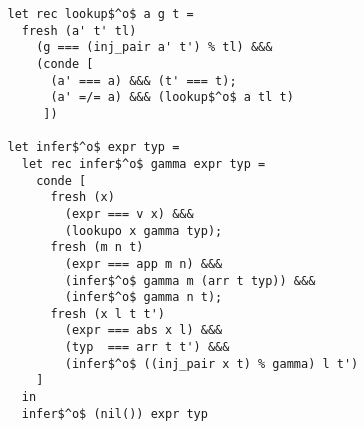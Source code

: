 \begin{lstlisting}
   let rec lookup$^o$ a g t =
     fresh (a' t' tl)
       (g === (inj_pair a' t') % tl) &&&
       (conde [
         (a' === a) &&& (t' === t);
         (a' =/= a) &&& (lookup$^o$ a tl t)
        ])

   let infer$^o$ expr typ =
     let rec infer$^o$ gamma expr typ =
       conde [
         fresh (x)
           (expr === v x) &&&
           (lookupo x gamma typ);
         fresh (m n t)
           (expr === app m n) &&&
           (infer$^o$ gamma m (arr t typ)) &&&
           (infer$^o$ gamma n t);
         fresh (x l t t')
           (expr === abs x l) &&&
           (typ  === arr t t') &&&
           (infer$^o$ ((inj_pair x t) % gamma) l t')
       ]
     in
     infer$^o$ (nil()) expr typ
\end{lstlisting}
